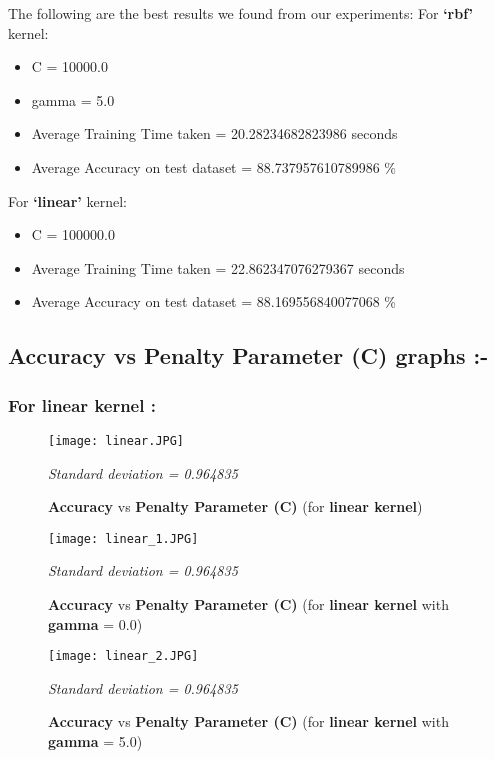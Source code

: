 \documentclass{report}
\begin{document}
The following are the best results we found from our experiments:
For \textbf{‘rbf’} kernel:
\begin{itemize}
\item C = 10000.0
\item gamma = 5.0
\item Average Training Time taken = 20.28234682823986 seconds
\item Average Accuracy on test dataset = 88.737957610789986 \%
\end{itemize}
For \textbf{‘linear’} kernel:
\begin{itemize}
\item C = 100000.0
\item Average Training Time taken = 22.862347076279367 seconds
\item Average Accuracy on test dataset = 88.169556840077068 \%
\end{itemize}
\pagebreak
\subsection{\textbf \Large {Accuracy }vs\textbf{ Penalty Parameter (C) graphs :-}}
\subsubsection{\textbf \Large  {For linear kernel :}}
\begin{figure}[!h]
  \texttt{[image: linear.JPG]}
  \caption{\textbf{Accuracy }vs\textbf{ Penalty Parameter (C)} (for \textbf{linear kernel})}
  \label{fig:}
\emph{\normalsize Standard deviation = 0.964835}
\end{figure}

\begin{figure}[!h]
  \texttt{[image: linear\_1.JPG]}
  \caption{\textbf{Accuracy }vs\textbf{ Penalty Parameter (C)} (for \textbf{linear kernel} with \textbf{gamma} = 0.0)}
  \label{fig:}
  \emph{\normalsize Standard deviation = 0.964835}
\end{figure}

\pagebreak
\begin{figure}[!h]
  \texttt{[image: linear\_2.JPG]}
  \caption{\textbf{Accuracy }vs\textbf{ Penalty Parameter (C)} (for \textbf{linear kernel} with \textbf{gamma} = 5.0)}
  \label{fig:}
  \emph{\normalsize Standard deviation = 0.964835}
\end{figure}
\end{document}
